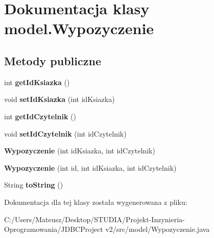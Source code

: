 \hypertarget{classmodel_1_1_wypozyczenie}{}\section{Dokumentacja klasy model.\+Wypozyczenie}
\label{classmodel_1_1_wypozyczenie}
\subsection*{Metody publiczne}
\begin{DoxyCompactItemize}
\item 
\hypertarget{classmodel_1_1_wypozyczenie_a39c3dd6fffd0a74d906129f854285395}{}int {\bfseries get\+Id\+Ksiazka} ()\label{classmodel_1_1_wypozyczenie_a39c3dd6fffd0a74d906129f854285395}

\item 
\hypertarget{classmodel_1_1_wypozyczenie_a9f4e45419040b7d3e76c9d912bafd318}{}void {\bfseries set\+Id\+Ksiazka} (int id\+Ksiazka)\label{classmodel_1_1_wypozyczenie_a9f4e45419040b7d3e76c9d912bafd318}

\item 
\hypertarget{classmodel_1_1_wypozyczenie_af979983b3d4687f8f2b90b153019233d}{}int {\bfseries get\+Id\+Czytelnik} ()\label{classmodel_1_1_wypozyczenie_af979983b3d4687f8f2b90b153019233d}

\item 
\hypertarget{classmodel_1_1_wypozyczenie_ae2d2d4b72c182a3d858a623d759e61bf}{}void {\bfseries set\+Id\+Czytelnik} (int id\+Czytelnik)\label{classmodel_1_1_wypozyczenie_ae2d2d4b72c182a3d858a623d759e61bf}

\item 
\hypertarget{classmodel_1_1_wypozyczenie_ad480eeab4a795e8892a877c7bbf5818f}{}{\bfseries Wypozyczenie} (int id\+Ksiazka, int id\+Czytelnik)\label{classmodel_1_1_wypozyczenie_ad480eeab4a795e8892a877c7bbf5818f}

\item 
\hypertarget{classmodel_1_1_wypozyczenie_a9e6df55be2c1d8e7dc49f0614cd0da56}{}{\bfseries Wypozyczenie} (int id, int id\+Ksiazka, int id\+Czytelnik)\label{classmodel_1_1_wypozyczenie_a9e6df55be2c1d8e7dc49f0614cd0da56}

\item 
\hypertarget{classmodel_1_1_wypozyczenie_ad0656f62fb92711844e3e6113df91473}{}String {\bfseries to\+String} ()\label{classmodel_1_1_wypozyczenie_ad0656f62fb92711844e3e6113df91473}

\end{DoxyCompactItemize}


Dokumentacja dla tej klasy została wygenerowana z pliku\+:\begin{DoxyCompactItemize}
\item 
C\+:/\+Users/\+Mateusz/\+Desktop/\+S\+T\+U\+D\+I\+A/\+Projekt-\/\+Inzynieria-\/\+Oprogramowania/\+J\+D\+B\+C\+Project v2/src/model/Wypozyczenie.\+java\end{DoxyCompactItemize}
